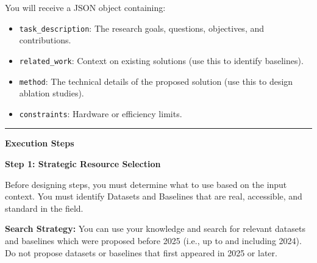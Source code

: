 \begin{tcolorbox}
You will receive a JSON object containing:
\begin{itemize}[nosep,leftmargin=12pt]
	\item \texttt{task\_description}: The research goals, questions, objectives, and contributions.
	\item \texttt{related\_work}: Context on existing solutions (use this to identify baselines).
	\item \texttt{method}: The technical details of the proposed solution (use this to design ablation studies).
	\item \texttt{constraints}: Hardware or efficiency limits.
\end{itemize}

\medskip\hrule\medskip

\textbf{Execution Steps}

\textbf{Step 1: Strategic Resource Selection}

Before designing steps, you must determine what to use based on the input context. You must identify Datasets and Baselines that are real, accessible, and standard in the field.

\textbf{Search Strategy:} You can use your knowledge and search for relevant datasets and baselines which were proposed before 2025 (i.e., up to and including 2024). Do not propose datasets or baselines that first appeared in 2025 or later.


\end{tcolorbox}
